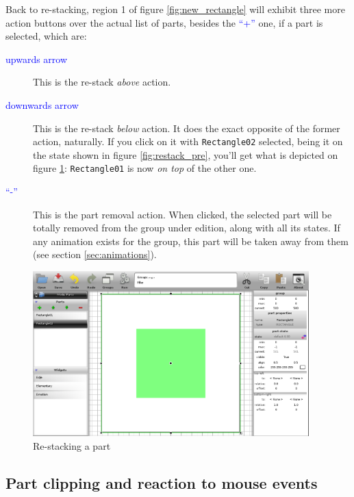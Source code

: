 \documentclass[a4paper]{profusion}
\newcommand{\GUIIcon}[1]{\textcolor{blue}{#1}}    %
\begin{document}
Back to re-stacking, region 1 of figure \ref{fig:new_rectangle} will
exhibit three more action buttons over the actual list of parts,
besides the \GUIIcon{``+''} one, if a part is selected, which are:

\begin{description}
\item[\GUIIcon{upwards arrow}] This is the re-stack \emph{above}
  action.

\item[\GUIIcon{downwards arrow}] This is the re-stack \emph{below}
  action. It does the exact opposite of the former action,
  naturally. If you click on it with \texttt{Rectangle02} selected,
  being it on the state shown in figure \ref{fig:restack_pre}, you'll
  get what is depicted on figure \ref{fig:restack}:
  \texttt{Rectangle01} is now \emph{on top} of the other one.

\item[\GUIIcon{``-''}] This is the part removal action. When clicked,
  the selected part will be totally removed from the group under
  edition, along with all its states. If any animation exists for the
  group, this part will be taken away from them (see section
  \ref{sec:animations}).
\end{description}

\begin{figure}[h!]
  \centering
  \includegraphics[width=0.95\textwidth]{images/rectangle_stack.png}
  \caption{Re-stacking a part}
  \label{fig:restack}
\end{figure}

\subsection{Part clipping and reaction to mouse events}
\end{document}
